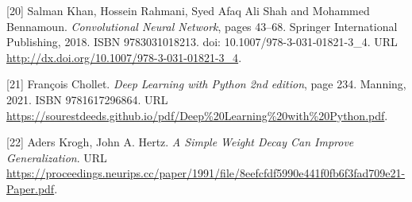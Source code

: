 \documentclass[11pt, a4paper]{article}
\numberwithin{equation}{section}
\begin{document}
\smallskip

\noindent \hypertarget{ref:20}{[20]} Salman Khan, Hossein Rahmani, Syed Afaq Ali Shah and Mohammed Bennamoun. \textit{Convolutional Neural Network}, pages 43--68. Springer International Publishing, 2018. ISBN 9783031018213. doi: 10.1007/978-3-031-01821-3\_4. URL \url{http://dx.doi.org/10.1007/978-3-031-01821-3_4}.

\smallskip

\noindent \hypertarget{ref:21}{[21]} François Chollet. \textit{Deep Learning with Python 2nd edition}, page 234. Manning, 2021. ISBN 9781617296864. URL \url{https://sourestdeeds.github.io/pdf/Deep%20Learning%20with%20Python.pdf}.

\smallskip

\noindent \hypertarget{ref:22}{[22]} Aders Krogh, John A. Hertz. \textit{A Simple Weight Decay Can Improve Generalization}. URL \url{https://proceedings.neurips.cc/paper/1991/file/8eefcfdf5990e441f0fb6f3fad709e21-Paper.pdf}.
\end{document}
